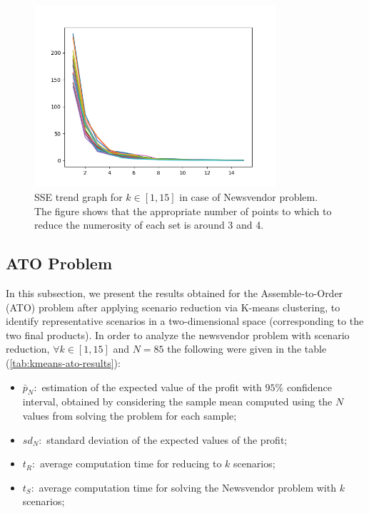 \documentclass[a4paper,12pt]{article}
\begin{document}
	\begin{figure}[H]
		\centering
		\includegraphics[width=0.8\textwidth]{../immagini/sseNV.png}
		\caption{SSE trend graph for $k \in [1,15]$ in case of Newsvendor problem. The figure shows that the appropriate number of points to which to reduce the numerosity of each set is around 3 and 4.}
		\label{fig:sse-nv}
	\end{figure}
	
	
	\subsection{ATO Problem}
	In this subsection, we present the results obtained for the Assemble-to-Order (ATO) problem after applying scenario reduction via K-means clustering, to identify representative scenarios in a two-dimensional space (corresponding to the two final products). In order to analyze the newsvendor problem with scenario reduction, $\forall k \in [1,15]$ and $N = 85$ the following were given in the table (\ref{tab:kmeans-ato-results}):
	\begin{itemize}
		\item $\bar{p}_{N}:$ estimation of the expected value of the profit with $95\%$ confidence interval, obtained by considering the sample mean computed using the $N$ values from solving the problem for each sample; 
		\item $sd_{N}:$ standard deviation of the expected values of the profit;
		\item $t_{R}:$ average computation time for reducing to $k$ scenarios;
		\item $t_{S}:$ average computation time for solving the Newsvendor problem with $k$ scenarios;
	\end{itemize}~
	
\end{document}
